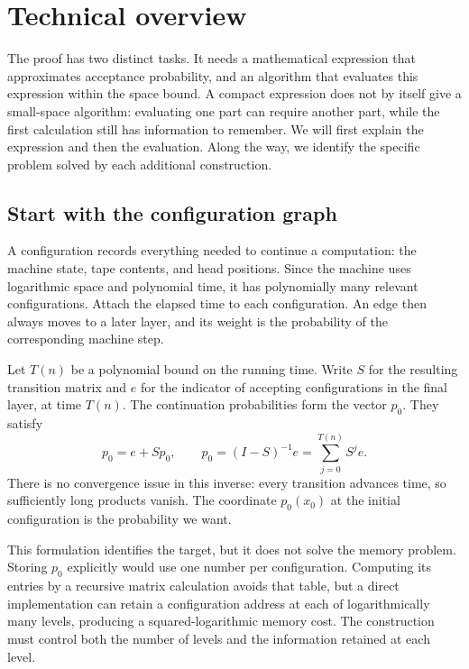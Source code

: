 \section{Technical overview}
\label{sec:overview}

The proof has two distinct tasks. It needs a mathematical expression that approximates acceptance probability, and an algorithm that evaluates this expression within the space bound. A compact expression does not by itself give a small-space algorithm: evaluating one part can require another part, while the first calculation still has information to remember. We will first explain the expression and then the evaluation. Along the way, we identify the specific problem solved by each additional construction.

\subsection{Start with the configuration graph}

A configuration records everything needed to continue a computation: the machine state, tape contents, and head positions. Since the machine uses logarithmic space and polynomial time, it has polynomially many relevant configurations. Attach the elapsed time to each configuration. An edge then always moves to a later layer, and its weight is the probability of the corresponding machine step.

Let $T(n)$ be a polynomial bound on the running time. Write $S$ for the resulting transition matrix and $e$ for the indicator of accepting configurations in the final layer, at time $T(n)$. The continuation probabilities form the vector $p_0$. They satisfy
\[
 p_0=e+Sp_0,
 \qquad
 p_0=(I-S)^{-1}e=\sum_{j=0}^{T(n)}S^j e.
\]
There is no convergence issue in this inverse: every transition advances time, so sufficiently long products vanish. The coordinate $p_0(x_0)$ at the initial configuration is the probability we want.

This formulation identifies the target, but it does not solve the memory problem. Storing $p_0$ explicitly would use one number per configuration. Computing its entries by a recursive matrix calculation avoids that table, but a direct implementation can retain a configuration address at each of logarithmically many levels, producing a squared-logarithmic memory cost. The construction must control both the number of levels and the information retained at each level.

